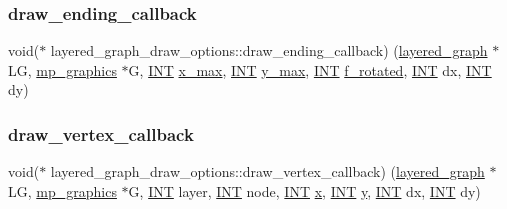 \subsubsection{\texorpdfstring{draw\+\_\+ending\+\_\+callback}{draw\_ending\_callback}}
{\footnotesize\ttfamily void($\ast$ layered\+\_\+graph\+\_\+draw\+\_\+options\+::draw\+\_\+ending\+\_\+callback) (\mbox{\hyperlink{classlayered__graph}{layered\+\_\+graph}} $\ast$LG, \mbox{\hyperlink{classmp__graphics}{mp\+\_\+graphics}} $\ast$G, \mbox{\hyperlink{galois_8h_a09fddde158a3a20bd2dcadb609de11dc}{I\+NT}} \mbox{\hyperlink{classlayered__graph__draw__options_a3bb0daa2aa60aae0d5806124b6032e4b}{x\+\_\+max}}, \mbox{\hyperlink{galois_8h_a09fddde158a3a20bd2dcadb609de11dc}{I\+NT}} \mbox{\hyperlink{classlayered__graph__draw__options_a669e7c5208f3fbe5f60b8bc57ee0af54}{y\+\_\+max}}, \mbox{\hyperlink{galois_8h_a09fddde158a3a20bd2dcadb609de11dc}{I\+NT}} \mbox{\hyperlink{classlayered__graph__draw__options_a7c5f575308980cb592e8a3e7ff35771c}{f\+\_\+rotated}}, \mbox{\hyperlink{galois_8h_a09fddde158a3a20bd2dcadb609de11dc}{I\+NT}} dx, \mbox{\hyperlink{galois_8h_a09fddde158a3a20bd2dcadb609de11dc}{I\+NT}} dy)}

\mbox{\label{classlayered__graph__draw__options_aeff04f23419d7e9f5d61e3871ab9e1dd}} 
\subsubsection{\texorpdfstring{draw\+\_\+vertex\+\_\+callback}{draw\_vertex\_callback}}
{\footnotesize\ttfamily void($\ast$ layered\+\_\+graph\+\_\+draw\+\_\+options\+::draw\+\_\+vertex\+\_\+callback) (\mbox{\hyperlink{classlayered__graph}{layered\+\_\+graph}} $\ast$LG, \mbox{\hyperlink{classmp__graphics}{mp\+\_\+graphics}} $\ast$G, \mbox{\hyperlink{galois_8h_a09fddde158a3a20bd2dcadb609de11dc}{I\+NT}} layer, \mbox{\hyperlink{galois_8h_a09fddde158a3a20bd2dcadb609de11dc}{I\+NT}} node, \mbox{\hyperlink{galois_8h_a09fddde158a3a20bd2dcadb609de11dc}{I\+NT}} \mbox{\hyperlink{alphabet2_8_c_a6150e0515f7202e2fb518f7206ed97dc}{x}}, \mbox{\hyperlink{galois_8h_a09fddde158a3a20bd2dcadb609de11dc}{I\+NT}} \mbox{\hyperlink{alphabet2_8_c_a0a2f84ed7838f07779ae24c5a9086d33}{y}}, \mbox{\hyperlink{galois_8h_a09fddde158a3a20bd2dcadb609de11dc}{I\+NT}} dx, \mbox{\hyperlink{galois_8h_a09fddde158a3a20bd2dcadb609de11dc}{I\+NT}} dy)}

